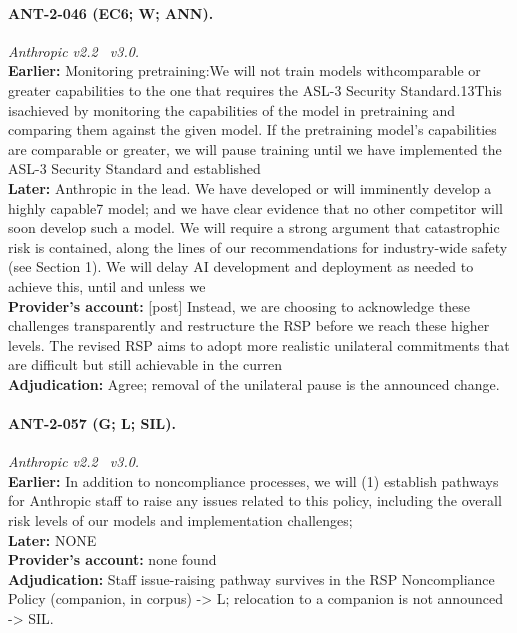 \paragraph{ANT-2-046 (EC6; W; ANN).} \emph{Anthropic v2.2 \textrightarrow\ v3.0.}\\
\textbf{Earlier:} Monitoring pretraining:We will not train models withcomparable or greater capabilities to the one that requires the ASL-3 Security Standard.13This isachieved by monitoring the capabilities of the model in pretraining and comparing them against the given model. If the pretraining model's capabilities are comparable or greater, we will pause training until we have implemented the ASL-3 Security Standard and established\\
\textbf{Later:} Anthropic in the lead. We have developed or will imminently develop a highly capable7 model; and we have clear evidence that no other competitor will soon develop such a model. We will require a strong argument that catastrophic risk is contained, along the lines of our recommendations for industry-wide safety (see Section 1). We will delay AI development and deployment as needed to achieve this, until and unless we \\
\textbf{Provider's account:} [post] Instead, we are choosing to acknowledge these challenges transparently and restructure the RSP before we reach these higher levels. The revised RSP aims to adopt more realistic unilateral commitments that are difficult but still achievable in the curren\\
\textbf{Adjudication:} Agree; removal of the unilateral pause is the announced change.

\paragraph{ANT-2-057 (G; L; SIL).} \emph{Anthropic v2.2 \textrightarrow\ v3.0.}\\
\textbf{Earlier:} In addition to noncompliance processes, we will (1) establish pathways for Anthropic staff to raise any issues related to this policy, including the overall risk levels of our models and implementation challenges;\\
\textbf{Later:} NONE\\
\textbf{Provider's account:} none found\\
\textbf{Adjudication:} Staff issue-raising pathway survives in the RSP Noncompliance Policy (companion, in corpus) -> L; relocation to a companion is not announced -> SIL.


